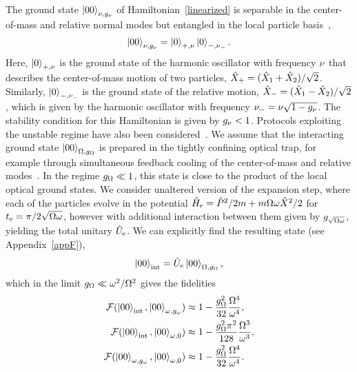 \documentclass[reprint,prx,footinbib,floatfix,twocolumn,longbibliography,superscriptaddress]{revtex4-2}
\begin{document}
The ground state $\ket{00}_{\nu,g_\nu}$ of Hamiltonian~\eqref{linearized} is separable in the center-of-mass and relative normal modes but entangled in the local particle basis~\cite{Hong-Yi1992,Zhou2020},
\begin{align}
\ket{00}_{\nu,g_\nu} = \ket{0}_{+,\nu} \ket{0}_{-,\nu_-}.
\end{align}
Here, $\ket{0}_{+,\nu}$ is the ground state of the harmonic oscillator with frequency $\nu$ that describes the center-of-mass motion of two particles, $\hat{X}_+ = (\hat{X}_1 + \hat{X}_2) /\sqrt{2}$.
Similarly, $\ket{0}_{-,\nu_-}$ is the ground state of the relative motion, $\hat{X}_- = (\hat{X}_1 - \hat{X}_2) /\sqrt{2}$, which is given by the harmonic oscillator with frequency $\nu_- = \nu \sqrt{1 - g_\nu}$.
The stability condition for this Hamiltonian is given by $ g_\nu < 1$.
Protocols exploiting the unstable regime have also been considered~\cite{Weiss2021}.
We assume that the interacting ground state $\ket{00}_{\Omega,g_\Omega}$ is prepared in the tightly confining optical trap, for example through simultaneous feedback cooling of the center-of-mass and relative modes~\cite{Rudolph2022}.
In the regime $g_\Omega \ll 1 $, this state is close to the product of the local optical ground states.
We consider unaltered version of the expansion step, where each of the particles evolve in the potential $\hat{H}_{\text{e}} =  \hat{P}^2 / 2 m +  m \Omega\omega \hat{X}^2/2$ for $t_{\text{e}} = \pi / 2 \sqrt{\Omega \omega}$, however with additional interaction between them given by $g_{\sqrt{\Omega \omega}}$, yielding the total unitary $\hat{U}_{\text{e}}$.
We can explicitly find the resulting state (see Appendix~\ref{appF}),
\begin{align}
\ket{00}_{\text{int}}  = \hat{U}_{\text{e}} \ket{00}_{\Omega,g_\Omega}, 
\end{align}
which in the limit $g_\Omega \ll \omega^2 / \Omega^2$ gives the fidelities
\begin{align} \mathcal{F}(\ket{00}_{\text{int}},\ket{00}_{\omega,g_\omega}) & \approx 1 - \frac{g_\Omega^2}{32} \frac{\Omega^4}{\omega^4}, \nonumber \\
\mathcal{F}(\ket{00}_{\text{int}},\ket{00}_{\omega,0}) & \approx 1 - \frac{g_\Omega^2 \pi^2}{128} \frac{\Omega^3}{\omega^3}    , \nonumber \\
\mathcal{F}(\ket{00}_{\omega,g_\omega},\ket{00}_{\omega,0}) & \approx 1 - \frac{g_\Omega^2}{32} \frac{\Omega^4}{\omega^4}.
\label{fids}
\end{align}
\end{document}
